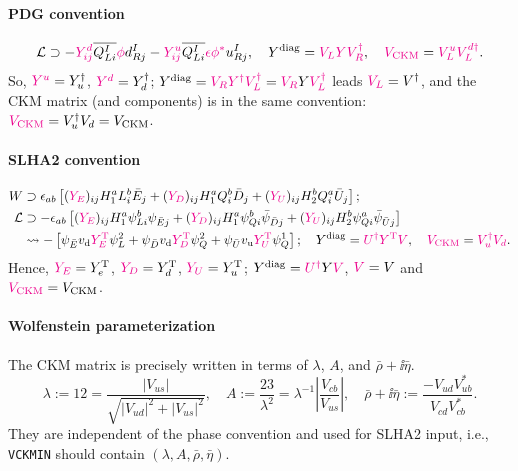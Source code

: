 \documentclass[CheatSheet]{subfiles}
\begin{document}
\paragraph{PDG convention} \cite[\S12]{PDG2018}\cite[\S12]{PDG2020}
\begin{equation}
 \mathcal L \supset
 -{\color{magenta}Y^d_{ij}}\overline{Q_{Li}^I}{\color{magenta}\phi} d_{Rj}^I
 -{\color{magenta}Y^u_{ij}}\overline{Q_{Li}^I}{\color{magenta}\epsilon\phi^*}u_{Rj}^I,
\quad Y^{\mathrm{diag}} = {\color{magenta}V_L Y V_R^\dagger},
\quad {\color{magenta}V_{\mathrm{CKM}}} = {\color{magenta}V^u_LV_L^{d\dagger}}.
\end{equation}
So, ${\color{magenta}Y^u}=Y_{u}^\dagger$, ${\color{magenta}Y^d}=Y_{d}^\dagger$;
$Y^{\mathrm{diag}} = {\color{magenta}V_RY^\dagger V_L^\dagger} = {\color{magenta}V_R}Y{\color{magenta}V_L^\dagger}$ leads ${\color{magenta}V_L}=V^\dagger$, and the CKM matrix (and components) is in the same convention: ${\color{magenta}V_{\mathrm{CKM}}}=V_u^\dagger V_d=V_{\mathrm{CKM}}$.


\paragraph{SLHA2 convention} \cite{SLHA2}
\begin{align}
 W &\supset \epsilon_{ab}\left[
({\color{magenta}Y_E})_{ij}H_1^a L_i^b \bar E_j
+({\color{magenta}Y_D})_{ij}H_1^a Q_i^b \bar D_j
+({\color{magenta}Y_U})_{ij}H_2^b Q_i^a \bar U_j
\right];
\\
\mathcal L&\supset
- \epsilon_{ab}\left[
({\color{magenta}Y_E})_{ij}H_1^a \psi_{Li}^b \psi_{\bar Ej}
+({\color{magenta}Y_D})_{ij}H_1^a \psi_{Qi}^b \bar \psi_{\bar Dj}
+({\color{magenta}Y_U})_{ij}H_2^b \psi_{Qi}^a \bar \psi_{\bar Uj}
\right]
\\&\leadsto
- \left[
\psi_{\bar E}v_{\mathrm{d}} {\color{magenta}Y_E^{\mathrm{T}}}\psi_L^2
+\psi_{\bar D}v_{\mathrm{d}}{\color{magenta}Y_D^{\mathrm{T}}}\psi_Q^2
+\psi_{\bar U}v_{\mathrm{u}}{\color{magenta}Y_U^{\mathrm{T}}}\psi_Q^1
\right];
\quad
Y^{\mathrm{diag}} = {\color{magenta}U^\dagger Y^{\mathrm{T}} V},
\quad
{\color{magenta}V_{\mathrm{CKM}}} = {\color{magenta}V_u^\dagger V_d}.
\end{align}
Hence, ${\color{magenta}Y_E}=Y_{e}^{\mathrm{T}}$, ${\color{magenta}Y_D}=Y_{d}^{\mathrm{T}}$, ${\color{magenta}Y_U}=Y_{u}^{\mathrm{T}}$;
$Y^{\mathrm{diag}}={\color{magenta}U^\dagger}Y{\color{magenta}V}$, ${\color{magenta}V}=V$ and ${\color{magenta}V_{\mathrm{CKM}}}=V_{\mathrm{CKM}}$.

\paragraph{Wolfenstein parameterization}
The CKM matrix is precisely written in terms of $\lambda$, $A$, and $\bar\rho+\ii\bar\eta$.
\begin{equation}
  \lambda := \si{12} = \frac{|V_{us}|}{\sqrt{|V_{ud}|^2+|V_{us}|^2}},
\quad
  A:=\frac{\si{23}}{\lambda^2}=\lambda^{-1}\left|\frac{V_{cb}}{V_{us}}\right|,
\quad
\bar\rho+\ii\bar\eta:=\frac{-V_{ud}V^*_{ub}}{V_{cd}V^*_{cb}}.
\end{equation}
They are independent of the phase convention and used for SLHA2 input, i.e., \texttt{VCKMIN} should contain $(\lambda, A, \bar\rho, \bar\eta)$.
\end{document}
